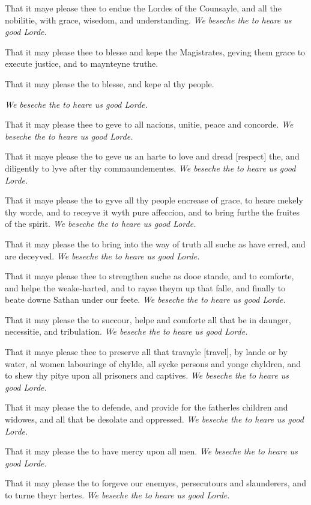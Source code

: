 That it maye please thee to endue the Lordes of the Counsayle, and all
the nobilitie, with grace, wisedom, and understanding.
\emph{We
beseche the to heare us good Lorde.}

That it may please thee to blesse and kepe the Magistrates, geving them
grace to execute justice, and to maynteyne truthe.

That
it may please the to blesse, and kepe al thy people.

\emph{We
beseche the to heare us good Lorde.}

That it may please thee to geve to all nacions, unitie, peace and concorde.
\emph{We
beseche the to heare us good Lorde.}

That it maye please the to geve us an harte to love and dread [respect]
the, and diligently to lyve after thy commaundementes.
\emph{We
beseche the to heare us good Lorde.}

That it maye please the to gyve all thy people encrease of grace, to heare
mekely thy worde, and to receyve it wyth pure affeccion, and to bring
furthe the fruites of the spirit.
\emph{We
beseche the to heare us good Lorde.}

That it may please the to bring into the way of truth all suche as have
erred, and are deceyved.
\emph{We
beseche the to heare us good Lorde.}

That it maye please thee to strengthen suche as dooe stande, and to comforte,
and helpe the weake-harted, and to rayse theym up that falle, and finally
to beate downe Sathan under our feete.
\emph{We
beseche the to heare us good Lorde.}

That it may please the to succour, helpe and comforte all that be in daunger,
necessitie, and tribulation.
\emph{We
beseche the to heare us good Lorde.}

That it maye please thee to preserve all that travayle [travel],
by lande or by water, al women labouringe of chylde, all sycke persons
and yonge chyldren, and to shew thy pitye upon all prisoners and captives.
\emph{We
beseche the to heare us good Lorde.}

That it may please the to defende, and provide for the fatherles children
and widowes, and all that be desolate and oppressed.
\emph{We
beseche the to heare us good Lorde.}

That it may please the to have mercy upon all men.
\emph{We
beseche the to heare us good Lorde.}

That it may please the to forgeve our enemyes, persecutours and slaunderers,
and to turne theyr hertes.
\emph{We
beseche the to heare us good Lorde.}

